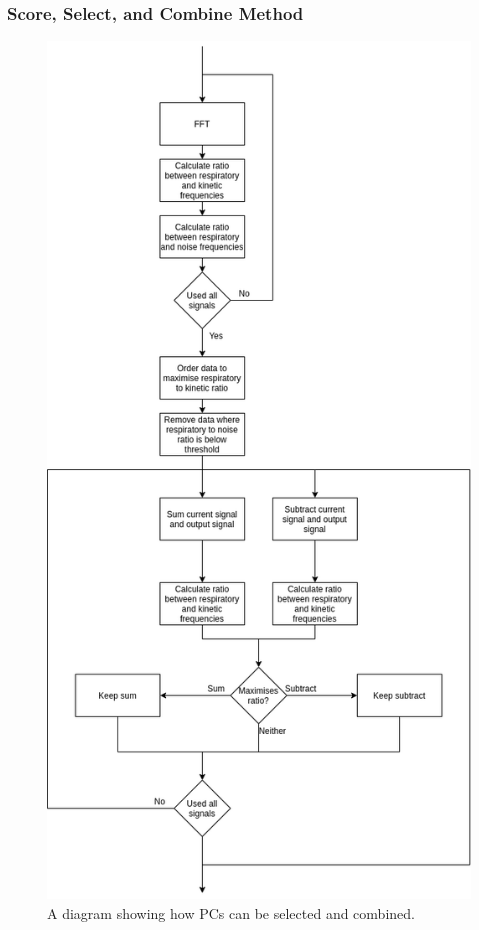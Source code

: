             \subsubsection{Score, Select, and Combine Method} \label{sec:pca_data_driven_surrogate_signal_extraction_methods_for_dynamic_pet_methods_score_select_and_combine_method}
                \begin{figure}
                    \centering
                    
                    \includegraphics[width=0.7\linewidth]{figures/data_driven_surrogate_signal_extraction_methods_1_select_and_combine.png}
                    
                    \captionsetup{singlelinecheck=false}
                    \caption{
                        A diagram showing how \glspl{PC} can be selected and combined.
                    }
                    \label{fig:pca_data_driven_surrogate_signal_extraction_methods_for_dynamic_pet_methods_select_and_combine}
                \end{figure}
                
